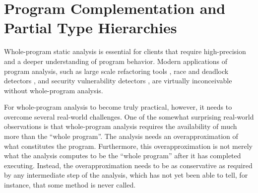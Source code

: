 %



\section{Program Complementation and Partial Type Hierarchies}
\label{hiercomp/sect/intro}

Whole-program static analysis is essential for clients that require
high-precision
and a deeper understanding of program behavior. Modern applications of
program analysis, such as large scale refactoring tools
\cite{journals/software/Dig11}, race and deadlock detectors
\cite{pldi/NaikAW06}, and security vulnerability detectors
\cite{sigsoft/MadsenLF13,uss/GuarnieriL09}, are virtually
inconceivable without whole-program analysis.

For whole-program analysis to become truly practical, however, it
needs to overcome several real-world challenges. One of the somewhat
surprising real-world observations is that whole-program analysis
requires the availability of much more than the ``whole program''.
The analysis needs an overapproximation of what constitutes the
program. Furthermore, this overapproximation is not merely
what the analysis computes to be the ``whole program'' after it
has completed executing. Instead, the overapproximation needs to be
as conservative as required by any intermediate step of the analysis,
which has not yet been able to tell, for instance, that some method
is never called.


